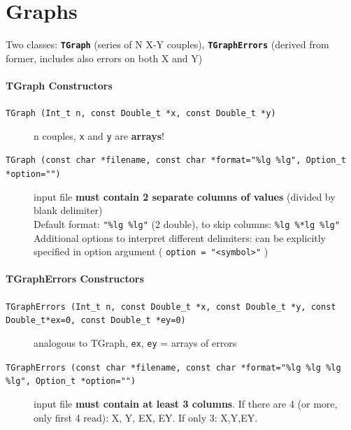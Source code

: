 \documentclass[10pt, oneside]{article}
\begin{document}
\section{Graphs}
Two classes: \textbf{\texttt{TGraph}} (series of N X-Y couples), \textbf{\texttt{TGraphErrors}} (derived from former, includes also errors on both X and Y)
\paragraph{TGraph Constructors}
\begin{description}
\item[\texttt{TGraph (Int\_t n, const Double\_t *x, const Double\_t *y)
}] n couples, \texttt{x} and \texttt{y} are \textbf{arrays}!
\item[\texttt{TGraph (const char *filename, const char *format="\%lg \%lg", 
Option\_t *option="")}] input file \textbf{must contain 2 separate columns of values} (divided by blank delimiter) 
\\Default format: \texttt{"\%lg \%lg"} (2 double), to skip columns: \texttt{\%lg \%*lg \%lg"}
\\Additional options to interpret different delimiters: can be explicitly specified in option argument ( \texttt{option = "<symbol>"} )
\end{description}
\paragraph{TGraphErrors Constructors}
\begin{description}
\item[\texttt{TGraphErrors (Int\_t n, const Double\_t *x, const Double\_t *y, const Double\_t*ex=0, const Double\_t *ey=0)}] analogous to TGraph, \texttt{ex}, \texttt{ey} = arrays of errors
\item[\texttt{TGraphErrors (const char *filename, const char *format="\%lg \%lg \%lg \%lg", Option\_t *option="")}] input file \textbf{must contain at least 3 columns}. If there are 4 (or more, only first 4 read): X, Y, EX, EY. If only 3: X,Y,EY.
\end{description}
\end{document}

